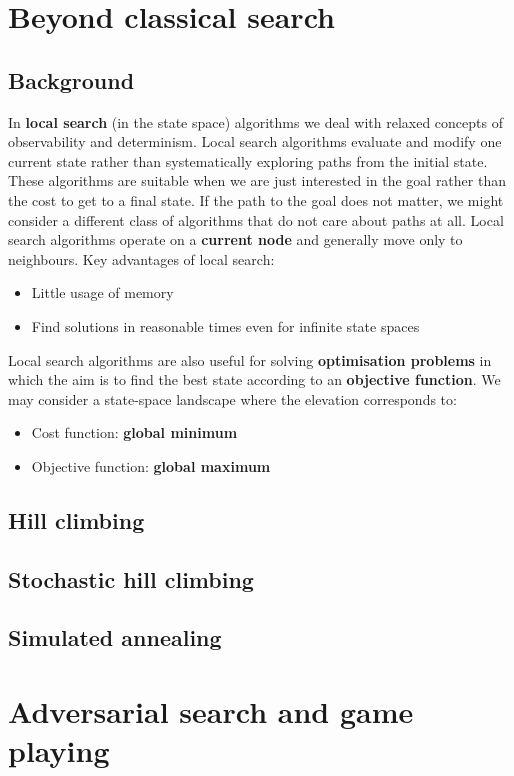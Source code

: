 \documentclass[a4paper, 11pt]{article}
\begin{document}
\section{Beyond classical search}

\subsection{Background}
In \textbf{local search} (in the state space) algorithms we deal with relaxed concepts of observability and determinism. Local search algorithms evaluate and modify one current state rather than systematically exploring paths from the initial state. These algorithms are suitable when we are just interested in the goal rather than the cost to get to a final state. If the path to the goal does not matter, we might consider a different class of algorithms that do not care about paths at all.
Local search algorithms operate on a \textbf{current node} and generally move only to neighbours.
Key advantages of local search:
\begin{itemize}
  \item Little usage of memory
  \item Find solutions in reasonable times even for infinite state spaces
\end{itemize}

Local search algorithms are also useful for solving \textbf{optimisation problems} in which the aim is to find the best state according to an \textbf{objective function}.
We may consider a state-space landscape where the elevation corresponds to:
\begin{itemize}
  \item Cost function: \textbf{global minimum}
  \item Objective function: \textbf{global maximum}
\end{itemize}

\subsection*{Hill climbing}

\subsection*{Stochastic hill climbing}

\subsection*{Simulated annealing}

\section{Adversarial search and game playing}
\end{document}
